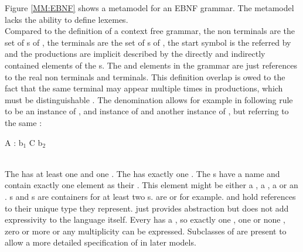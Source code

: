 Figure \ref{MM:EBNF} shows a metamodel for an EBNF grammar. The metamodel lacks the ability to define lexemes.  \\
Compared to the definition of a context free grammar, the non terminals are the set of s of , the terminals are the set of s of , the start symbol is the  referred by  and the productions are implicit described by the directly and indirectly contained elements of the s. The  and  elements in the grammar are just references to the real non terminals and terminals. This definition overlap is owed to the fact that the same terminal may appear multiple times in productions, which must be distinguishable . The denomination allows for example in following rule to be  an instance of ,  and instance of  and  another instance of , but referring to the same :
\\\begin{code}
A : b$_1$ C b$_2$
\end{code}\\

The  has at least one  and one . The  has exactly one . The s have a name and contain exactly one element as their . This element might be either a , a , a  or an . s and s are containers for at least two s.  are  or  for example.  and  hold references to their unique type they represent.  just provides abstraction but does not add expressivity to the language itself. Every  has a , so exactly one , one or none , zero or more \code{+} or any multiplicity \code{*} can be expressed. Subclasses of  are present to allow a more detailed specification of  in later models.



